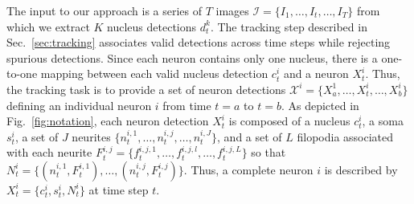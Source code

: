 

\vspace{-3mm}

The input  to our approach  is a series  of $T$ images  $\mathcal{I} =
\{I_1, \ldots, I_t,  \ldots, I_T\}$ from which we  extract $K$ nucleus
detections    $d_t^k$.     The     tracking    step    described    in
Sec.~\ref{sec:tracking} associates valid  detections across time steps
while rejecting  spurious detections. Since each  neuron contains only
one nucleus, there is a  one-to-one mapping between each valid nucleus
detection  $c_t^i$ and  a neuron  $X_t^i$. Thus,  the tracking task  is to
provide    a    set   of    neuron    detections   $\mathcal{X}^i    =
\{X_{a}^1,\ldots,X_t^i,\ldots,X_{b}^i   \}$  defining   an  individual
neuron   $i$   from   time   $t=a$   to   $t=b$.    As   depicted   in
Fig.~\ref{fig:notation}, each neuron  detection $X_t^i$ is composed of
a nucleus $c_t^i$, a soma $s_t^i$, a set of $J$ neurites $\{n_t^{i,1},
\ldots, n_t^{i,j}, \ldots,  n_t^{i,J} \}$, and a set  of $L$ filopodia
associated       with       each       neurite      $F_t^{i,j}       =
\{f_t^{i,j,1},\ldots,f_t^{i,j,l},\ldots,f_t^{i,j,L} \}$ so that $N_t^i
=  \{( n_t^{i,1},F_t^{i,1}), \ldots,(n_t^{i,j},F_t^{i,j})  \}$.  Thus,
a complete neuron $i$ is described by
$X_t^i = \{ c_t^i, s_t^i, N_t^i \}$ at time step $t$.








